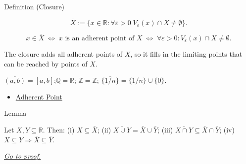 \begin{definitionbox}{Definition (Closure)}
\begin{definition}[Closure]
\label{def:closure-r}
\[
\overline{X}
:=
\{x\in\mathbb{R}:\forall\varepsilon>0\;V_\varepsilon(x)\cap X\neq\emptyset\}.
\]
\end{definition}
\end{definitionbox}

\begin{remark*}
\[
  x \in \overline{X}
  \;\iff\;
  x\text{ is an adherent point of }X
  \;\iff\;
  \forall\varepsilon>0 : V_\varepsilon(x)\cap X\neq\emptyset.
\]
\end{remark*}

\begin{remark*}[Interpretation]
The closure adds all adherent points of $X$, so it fills in the limiting
points that can be reached by points of $X$.
\end{remark*}

\begin{remark*}
$\overline{(a,b)} = [a,b]$;\quad $\overline{\mathbb{Q}} = \mathbb{R}$;\quad
$\overline{\mathbb{Z}} = \mathbb{Z}$;\quad
$\overline{\{1/n\}} = \{1/n\}\cup\{0\}$.
\end{remark*}

\begin{dependencies}
\begin{itemize}
  \item \hyperref[def:adherent-point-r]{Adherent Point}
\end{itemize}
\end{dependencies}


\begin{lemmabox}{Lemma}
\begin{lemma}
\label{lem:closure-elementary}
Let $X, Y \subseteq \mathbb{R}$. Then: (i) $X \subseteq \overline{X}$;
(ii) $\overline{X \cup Y} = \overline{X} \cup \overline{Y}$;
(iii) $\overline{X \cap Y} \subseteq \overline{X} \cap \overline{Y}$;
(iv) $X \subseteq Y \Rightarrow \overline{X} \subseteq \overline{Y}$.

\smallskip\noindent
\hyperref[prf:closure-elementary]{\textit{Go to proof.}}
\end{lemma}
\end{lemmabox}

